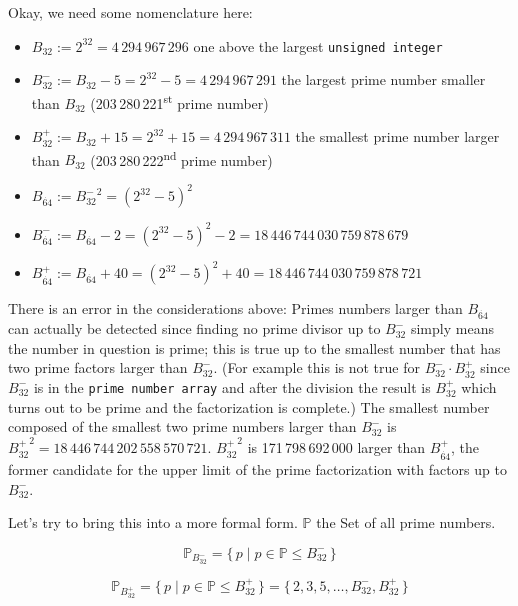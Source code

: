 \documentclass[a4paper,10pt]{article}
\begin{document}
Okay, we need some nomenclature here:
\begin{itemize}
 \item $B_{32} := 2^{32} = 4\,294\,967\,296$ one above the largest \texttt{unsigned integer}
 \item $B^-_{32} := B_{32} - 5 = 2^{32} - 5 = 4\,294\,967\,291$ the largest prime number smaller than $B_{32}$ (203\,280\,221\textsuperscript{st} prime number)
 \item $B^+_{32} := B_{32} + 15 = 2^{32} + 15 = 4\,294\,967\,311$ the smallest prime number larger than $B_{32}$ (203\,280\,222\textsuperscript{nd} prime number)
 \item $B_{\dot{64}} := {B^-_{32}}^2 = (2^{32} - 5)^2$
 \item $B^-_{\dot{64}} := B_{\dot{64}} - 2 = (2^{32} - 5)^2 - 2 = 18\,446\,744\,030\,759\,878\,679$
 \item $B^+_{\dot{64}} := B_{\dot{64}} + 40 = (2^{32} - 5)^2 + 40 = 18\,446\,744\,030\,759\,878\,721$
\end{itemize}


There is an error in the considerations above:
Primes numbers larger than $B_{\dot{64}}$ can actually be detected
since finding no prime divisor up to $B^-_{32}$ simply means the number in question is prime;
this is true up to the smallest number that has two prime factors larger than $B^-_{32}$.
(For example this is not true for $B^-_{32}\cdot B^+_{32}$
since $B^-_{32}$ is in the \texttt{prime number array}
and after the division the result is $B^+_{32}$ which turns out to be prime and the factorization is complete.)
The smallest number composed of the smallest two prime numbers larger than $B^-_{32}$ is ${B^+_{32}}^2 = 18\,446\,744\,202\,558\,570\,721$.
${B^+_{32}}^2$ is 171\,798\,692\,000 larger than $B^+_{\dot{64}}$,
the former candidate for the upper limit of the prime factorization with factors up to $B^-_{32}$.


\newcommand{\PP}{\mathbb{P}}
\newcommand{\NN}{\mathbb{N}}
\newcommand{\TT}{\mathbb{T}}
\newcommand{\Bm}[1]{B^-_{32}}
\newcommand{\Bp}[1]{B^+_{32}}
\newcommand{\set}[1]{\lbrace \, {#1} \, \rbrace}
\newcommand{\Set}[2]{\set{ {#1} \;|\; {#2} }}

Let's try to bring this into a more formal form.
$\PP$ the Set of all prime numbers.

$$\PP_{\Bm{32}} = \Set{p}{p \in \PP \leq \Bm{32}}$$

$$\PP_{\Bp{32}} = \Set{p}{p \in \PP \leq \Bp{32}} = \set{2, 3, 5, \dots, \Bm{32}, \Bp{32}}$$
\end{document}
